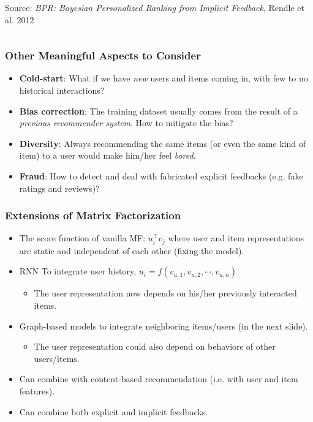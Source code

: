 \documentclass[11pt]{beamer}
\begin{document}
\begin{frame}
\begin{columns}
\begin{column}{0.4\textwidth}
\begin{center}
					{\tiny Source: \textit{BPR: Bayesian Personalized Ranking from Implicit Feedback}, Rendle et al. 2012}
				\end{center}
			\end{column}
		\end{columns}
	\end{frame}

	\begin{frame}
		\frametitle{Other Meaningful Aspects to Consider}
		\begin{itemize}
			\item \textbf{Cold-start}: What if we have \textit{new} users and items coming in, with few to no historical interactions? \pause
			\item \textbf{Bias correction}: The training dataset usually comes from the result of a \textit{previous recommender system}.  How to mitigate the bias? \pause
			\item \textbf{Diversity}: Always recommending the same items (or even the same kind of item) to a user would make him/her feel \textit{bored}. \pause
			\item \textbf{Fraud}: How to detect and deal with fabricated explicit feedbacks (e.g. fake ratings and reviews)?
		\end{itemize}
	\end{frame}

	\begin{frame}
		\frametitle{Extensions of Matrix Factorization}
		\begin{itemize}
			\item The score function of vanilla MF: $u_i^\top v_j$ where user and item representations are static and independent of each other (fixing the model).
			\item RNN To integrate user history, $u_i = f(v_{u, 1}, v_{u, 2}, \cdots, v_{u, n})$
			\begin{itemize}
				\item The user representation now depends on his/her previously interacted items.
			\end{itemize}
			\item Graph-based models to integrate neighboring items/users (in the next slide).
			\begin{itemize}
				\item The user representation could also depend on behaviors of other users/items.
			\end{itemize}
			\item Can combine with content-based recommendation (i.e. with user and item features).
			\item Can combine both explicit and implicit feedbacks.
		\end{itemize}
	\end{frame}
\end{document}
